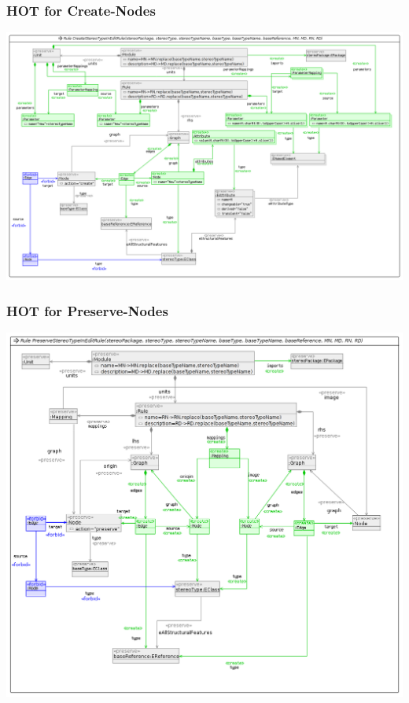 \documentclass[10pt]{beamer}
\begin{document}
\begin{frame}
\frametitle{HOT for Create-Nodes}
\begin{center}
\includegraphics[scale=0.28]{CREATE_STEREOTYPE_IN_EDITRULE}\\
\end{center}
\end{frame}
\begin{frame}
\frametitle{HOT for Preserve-Nodes}
\begin{center}
\includegraphics[scale=0.3]{PRESERVE_STEREOTYPE_IN_EDITRULE}\\
\end{center}
\end{frame}
\end{document}
